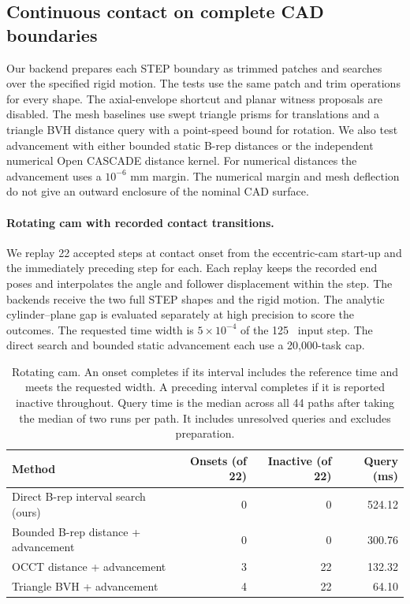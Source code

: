 \subsection{Continuous contact on complete CAD boundaries}
\label{sec:general-contact}
Our backend prepares each STEP boundary as trimmed patches and searches over the specified rigid motion. The tests use the same patch and trim operations for every shape. The axial-envelope shortcut and planar witness proposals are disabled. The mesh baselines use swept triangle prisms for translations and a triangle BVH distance query with a point-speed bound for rotation. We also test advancement with either bounded static B-rep distances or the independent numerical Open CASCADE distance kernel. For numerical distances the advancement uses a $10^{-6}$ mm margin. The numerical margin and mesh deflection do not give an outward enclosure of the nominal CAD surface.

\paragraph{Rotating cam with recorded contact transitions.}
We replay 22 accepted steps at contact onset from the eccentric-cam start-up and the immediately preceding step for each. Each replay keeps the recorded end poses and interpolates the angle and follower displacement within the step. The backends receive the two full STEP shapes and the rigid motion. The analytic cylinder--plane gap is evaluated separately at high precision to score the outcomes. The requested time width is $5\times10^{-4}$ of the 125~\microsec{} input step. The direct search and bounded static advancement each use a 20,000-task cap.

\begin{table}[pos=!htbp]
\small\centering
\caption{Rotating cam. An onset completes if its interval includes the reference time and meets the requested width. A preceding interval completes if it is reported inactive throughout. Query time is the median across all 44 paths after taking the median of two runs per path. It includes unresolved queries and excludes preparation.}
\label{tab:cam-onset}
\begin{tabular}{lrrr}\toprule
Method & Onsets (of 22) & Inactive (of 22) & Query (ms) \\\midrule
Direct B-rep interval search (ours) & 0 & 0 & 524.12 \\
Bounded B-rep distance + advancement & 0 & 0 & 300.76 \\
OCCT distance + advancement & 3 & 22 & 132.32 \\
Triangle BVH + advancement & 4 & 22 & 64.10 \\
\bottomrule\end{tabular}
\end{table}


